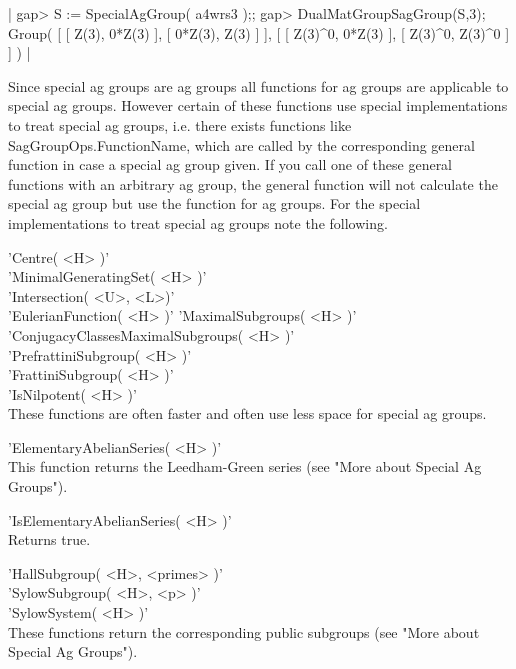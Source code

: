 |    gap> S := SpecialAgGroup( a4wrs3 );;
    gap> DualMatGroupSagGroup(S,3);
    Group( [ [ Z(3), 0*Z(3) ], [ 0*Z(3), Z(3) ] ], 
    [ [ Z(3)^0, 0*Z(3) ], [ Z(3)^0, Z(3)^0 ] ] ) |


Since special ag groups are ag groups all functions for ag groups are
applicable to special ag groups. However certain of these functions use
special implementations to treat special ag groups, i.e. there exists
functions like SagGroupOps.FunctionName, which are called by the
corresponding general function in case a special ag group given.  If you
call one of these general functions with an arbitrary ag group, the
general function will not calculate the special ag group but use the
function for ag groups.  For the special implementations to treat special
ag groups note the following.

\vspace{.5cm}
'Centre( <H> )' \\
'MinimalGeneratingSet( <H> )' \\
'Intersection( <U>, <L>)' \\
'EulerianFunction( <H> )'
'MaximalSubgroups( <H> )' \\
'ConjugacyClassesMaximalSubgroups( <H> )' \\
'PrefrattiniSubgroup( <H> )' \\
'FrattiniSubgroup( <H> )' \\
'IsNilpotent( <H> )' \\
These functions are often faster and often use less space for special ag
groups.

\vspace{.5cm}
'ElementaryAbelianSeries( <H> )' \\
This function returns the Leedham-Green series (see "More about Special
Ag Groups").

\vspace{.5cm}
'IsElementaryAbelianSeries( <H> )' \\
Returns true. 

\vspace{.5cm}
'HallSubgroup( <H>, <primes> )' \\
'SylowSubgroup( <H>, <p> )' \\
'SylowSystem( <H> )' \\
These functions return the corresponding public subgroups (see "More
about Special Ag Groups").

